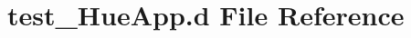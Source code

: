 \hypertarget{test___hue_app_8d}{}\section{test\+\_\+\+Hue\+App.\+d File Reference}
\label{test___hue_app_8d}
